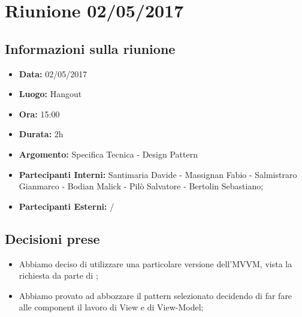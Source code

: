 \section{Riunione 02/05/2017}
  \subsection{Informazioni sulla riunione}
    \begin{itemize}
      \item \textbf{Data: }02/05/2017
      \item \textbf{Luogo: }Hangout
      \item \textbf{Ora: }15:00
      \item \textbf{Durata: }2h
      \item \textbf{Argomento: }Specifica Tecnica - Design Pattern
      \item \textbf{Partecipanti Interni: }Santimaria Davide - Massignan Fabio - Salmistraro Gianmarco - Bodian Malick - Pilò Salvatore - Bertolin Sebastiano;
      \item \textbf{Partecipanti Esterni: }/
    \end{itemize}
  \subsection{Decisioni prese}
		\begin{itemize}
			\item Abbiamo deciso di utilizzare una particolare versione dell'MVVM, vista la richiesta da parte di ;
      \item Abbiamo provato ad abbozzare il pattern selezionato decidendo di far fare alle component il lavoro di View e di View-Model;
		\end{itemize}

